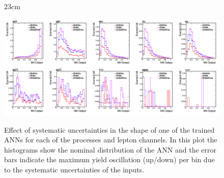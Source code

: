 \begin{landscape}
\begin{figure}[hbtp]{23cm}
	\caption{Effect of systematic uncertainties in the shape of one of the trained ANNs for each of the processes and lepton channels. In this plot the histograms show the nominal distribution of the ANN and the error bars indicate the maximum yield oscillation (up/down) per bin due to the systematic uncertainties of the inputs.}
	\centering
	\includegraphics[scale=0.55]{ChapterAnalysis/figs/nn_shape_systematic_uncertainty_per_proc_channel}
	\label{fig:nn_systematic_shifts}
\end{figure}
\end{landscape}


